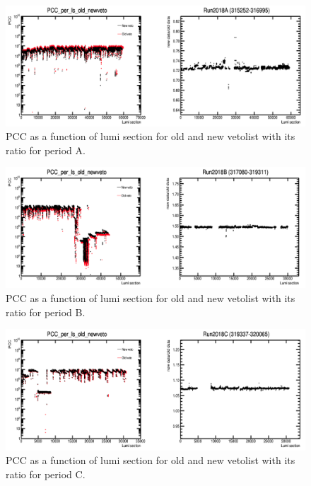 \begin{figure}[!htp]
\centering
\includegraphics[width=1\textwidth]{ashish_thesis/Run2018A_old_new_veto.png}
\caption{%
   PCC as a function of lumi section for old and new vetolist with its ratio for period A.
}
\label{fig:old_new_veto_A}
\end{figure}

\begin{figure}[!htp]
\centering
\includegraphics[width=1\textwidth]{ashish_thesis/Run2018B_old_new_veto.png}
\caption{%
    PCC as a function of lumi section for old and new vetolist with its ratio for period B.
}
\label{fig:old_new_veto_B}
\end{figure}


\begin{figure}[!htp]
\centering
\includegraphics[width=1\textwidth]{ashish_thesis/Run2018C_old_new_veto.png}
\caption{%
    PCC as a function of lumi section for old and new vetolist with its ratio for period C.
}
\label{fig:old_new_veto_C}
\end{figure}


